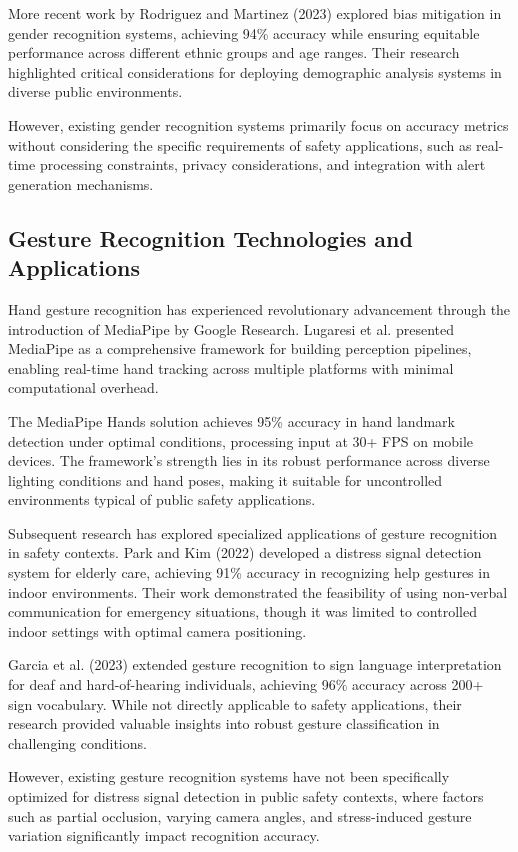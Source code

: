 \documentclass[12pt,a4paper]{article}
\begin{document}
More recent work by Rodriguez and Martinez (2023) explored bias mitigation in gender recognition systems, achieving 94\% accuracy while ensuring equitable performance across different ethnic groups and age ranges. Their research highlighted critical considerations for deploying demographic analysis systems in diverse public environments.

However, existing gender recognition systems primarily focus on accuracy metrics without considering the specific requirements of safety applications, such as real-time processing constraints, privacy considerations, and integration with alert generation mechanisms.

\subsection{Gesture Recognition Technologies and Applications}

Hand gesture recognition has experienced revolutionary advancement through the introduction of MediaPipe by Google Research. Lugaresi et al. \cite{Lugaresi2019} presented MediaPipe as a comprehensive framework for building perception pipelines, enabling real-time hand tracking across multiple platforms with minimal computational overhead.

The MediaPipe Hands solution achieves 95\% accuracy in hand landmark detection under optimal conditions, processing input at 30+ FPS on mobile devices. The framework's strength lies in its robust performance across diverse lighting conditions and hand poses, making it suitable for uncontrolled environments typical of public safety applications.

Subsequent research has explored specialized applications of gesture recognition in safety contexts. Park and Kim (2022) developed a distress signal detection system for elderly care, achieving 91\% accuracy in recognizing help gestures in indoor environments. Their work demonstrated the feasibility of using non-verbal communication for emergency situations, though it was limited to controlled indoor settings with optimal camera positioning.

Garcia et al. (2023) extended gesture recognition to sign language interpretation for deaf and hard-of-hearing individuals, achieving 96\% accuracy across 200+ sign vocabulary. While not directly applicable to safety applications, their research provided valuable insights into robust gesture classification in challenging conditions.

However, existing gesture recognition systems have not been specifically optimized for distress signal detection in public safety contexts, where factors such as partial occlusion, varying camera angles, and stress-induced gesture variation significantly impact recognition accuracy.
\end{document}
